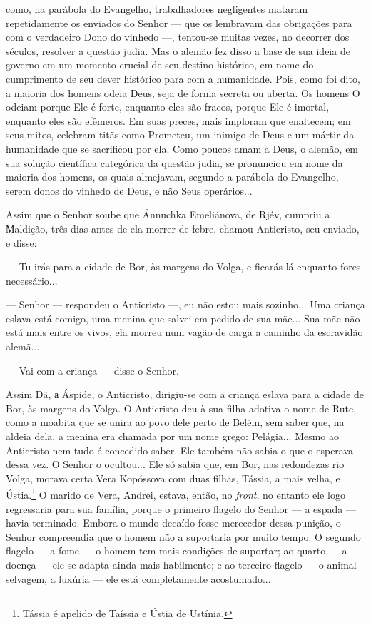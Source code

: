 como, na parábola do Evangelho, trabalhadores negligentes mataram
repetidamente os enviados do Senhor --- que os lembravam das obrigações
para com o verdadeiro Dono do vinhedo ---, tentou-se muitas vezes, no
decorrer dos séculos, resolver a questão judia. Mas o alemão fez disso a
base de sua ideia de governo em um momento crucial de seu destino
histórico, em nome do cumprimento de seu dever histórico para com a
humanidade. Pois, como foi dito, a maioria dos homens odeia Deus, seja
de forma secreta ou aberta. Os homens O odeiam porque Ele é forte,
enquanto eles são fracos, porque Ele é imortal, enquanto eles são
efêmeros. Em suas preces, mais imploram que enaltecem; em seus mitos,
celebram titãs como Prometeu, um inimigo de Deus e um mártir da
humanidade que se sacrificou por ela. Como poucos amam a Deus, o alemão,
em sua solução científica categórica da questão judia, se pronunciou em
nome da maioria dos homens, os quais almejavam, segundo a parábola do
Evangelho, serem donos do vinhedo de Deus, e não Seus operários...

Assim que o Senhor soube que Ánnuchka Emeliánova, de Rjév, cumpriu a
Мaldição, três dias antes de ela morrer de febre, chamou Anticristo, seu
enviado, e disse:

--- Tu irás para a cidade de Bor, às margens do Volga, e ficarás lá
enquanto fores necessário...

--- Senhor --- respondeu o Anticristo ---, eu não estou mais sozinho...
Uma criança eslava está comigo, uma menina que salvei em pedido de sua
mãe... Sua mãe não está mais entre os vivos, ela morreu num vagão de
carga a caminho da escravidão alemã...

--- Vai com a criança --- disse o Senhor.

Assim Dã, а Áspide, o Anticristo, dirigiu-se com a criança eslava para a
cidade de Bor, às margens do Volga. O Anticristo deu à sua filha adotiva
o nome de Rute, como a moabita que se unira ao povo dele perto de Belém,
sem saber que, na aldeia dela, a menina era chamada por um nome grego:
Pelágia... Mesmo ao Anticristo nem tudo é concedido saber. Ele também
não sabia o que o esperava dessa vez. O Senhor o ocultou... Ele só sabia
que, em Bor, nas redondezas rio Volga, morava certa Vera Kopóssova com
duas filhas, Tássia, a mais velha, e Ústia.\footnote{Tássia é apelido de
  Taíssia e Ústia de Ustínia.} O marido de Vera, Andrei, estava, então,
no \emph{front}, no entanto ele logo regressaria para sua família,
porque o primeiro flagelo do Senhor --- a espada --- havia terminado.
Embora o mundo decaído fosse merecedor dessa punição, o Senhor
compreendia que o homem não a suportaria por muito tempo. O segundo
flagelo --- a fome --- o homem tem mais condições de suportar; ao quarto
--- a doença --- ele se adapta ainda mais habilmente; e ao terceiro
flagelo --- o animal selvagem, a luxúria --- ele está completamente
acostumado...

